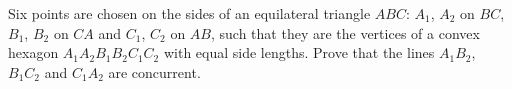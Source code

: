 Six points are chosen on the sides of an equilateral triangle $ABC$:
$A_1$, $A_2$ on $BC$, $B_1$, $B_2$ on $CA$ and $C_1$, $C_2$ on $AB$,
such that they are the vertices of a
convex hexagon $A_1A_2B_1B_2C_1C_2$ with equal side lengths.
Prove that the lines $A_1B_2$, $B_1C_2$ and $C_1A_2$ are concurrent.